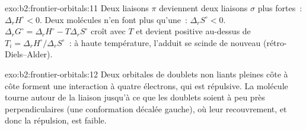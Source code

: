 \begin{solution}{exo:b2:frontier-orbitals:11}
Deux liaisons $\pi$ deviennent deux liaisons $\sigma$ plus fortes~: $\Delta_r H^\circ < 0$. Deux molécules n'en font plus qu'une~:
$\Delta_r S^\circ < 0$. $\Delta_r G^\circ = \Delta_r H^\circ - T\Delta_r S^\circ$ croît avec $T$ et devient
positive au-dessus de $T_i = \Delta_r H^\circ/\Delta_r S^\circ$~: à haute température, l'adduit se scinde de nouveau
(rétro-Diels--Alder).
\end{solution}

\begin{solution}{exo:b2:frontier-orbitals:12}
Deux orbitales de doublets non liants pleines côte à côte forment une interaction à quatre électrons, qui
est répulsive. La molécule tourne autour de la liaison  jusqu'à ce que les doublets soient à peu près
perpendiculaires (une conformation décalée gauche), où leur recouvrement, et donc la répulsion, est
faible.
\end{solution}

